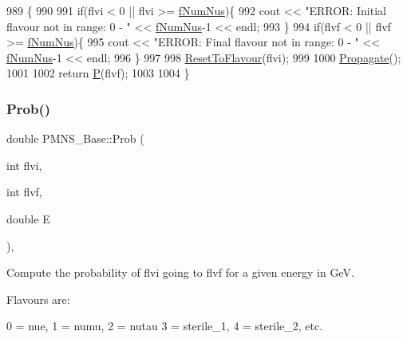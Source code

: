 \begin{DoxyCode}
989 \{
990 
991   \textcolor{keywordflow}{if}(flvi < 0 || flvi >= \hyperlink{classOscProb_1_1PMNS__Base_a24bb74bed63569dfe88b18fa6a08060e}{fNumNus})\{
992     cout << \textcolor{stringliteral}{"ERROR: Initial flavour not in range: 0 - "} << \hyperlink{classOscProb_1_1PMNS__Base_a24bb74bed63569dfe88b18fa6a08060e}{fNumNus}-1 << endl;
993   \}
994   \textcolor{keywordflow}{if}(flvf < 0 || flvf >= \hyperlink{classOscProb_1_1PMNS__Base_a24bb74bed63569dfe88b18fa6a08060e}{fNumNus})\{
995     cout << \textcolor{stringliteral}{"ERROR: Final flavour not in range: 0 - "} << \hyperlink{classOscProb_1_1PMNS__Base_a24bb74bed63569dfe88b18fa6a08060e}{fNumNus}-1 << endl;
996   \}
997 
998   \hyperlink{classOscProb_1_1PMNS__Base_ac0d4bf8ff1318ef96d3dafa62e0cec25}{ResetToFlavour}(flvi);
999 
1000   \hyperlink{classOscProb_1_1PMNS__Base_a054e3a8b05b9a958b6fa416e4a835e3e}{Propagate}();
1001 
1002   \textcolor{keywordflow}{return} \hyperlink{classOscProb_1_1PMNS__Base_a0dc4d45bc3d7e03b9abbf5b4e100cc22}{P}(flvf);
1003 
1004 \}
\end{DoxyCode}
\mbox{\label{classOscProb_1_1PMNS__Base_aa3cee10639d5c0879ccb9e78d62128d3}} 
\subsubsection{\texorpdfstring{Prob()}{Prob()}\hspace{0.1cm}{\footnotesize\ttfamily [2/3]}}
{\footnotesize\ttfamily double P\+M\+N\+S\+\_\+\+Base\+::\+Prob (\begin{DoxyParamCaption}\item[{int}]{flvi,  }\item[{int}]{flvf,  }\item[{double}]{E }\end{DoxyParamCaption})\hspace{0.3cm}{\ttfamily [virtual]}, {\ttfamily [inherited]}}

Compute the probability of flvi going to flvf for a given energy in GeV.

Flavours are\+: 
\begin{DoxyPre}
  0 = nue, 1 = numu, 2 = nutau
  3 = sterile\_1, 4 = sterile\_2, etc.
\end{DoxyPre}
 
